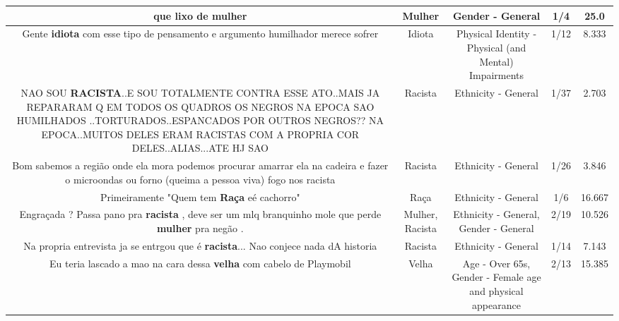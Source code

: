 \documentclass[11pt]{article}
\newlength\mylength
\begin{document}
\begin{center}
\begin{longtable}{|C{.65\mylength}|C{.30\mylength}|C{.12\mylength}|C{.12\mylength}|C{.12\mylength}|}
  \small que lixo de mulher\normalsize   & Mulher & Gender - General & 1/4 & 25.0 \\  \hline
  \small Gente \textbf{idiota} com esse tipo de pensamento e argumento humilhador merece sofrer\normalsize   & Idiota & Physical Identity - Physical (and Mental) Impairments & 1/12 & 8.333 \\  \hline
  \small NAO SOU \textbf{RACISTA}..E SOU TOTALMENTE CONTRA ESSE ATO..MAIS JA REPARARAM Q EM TODOS OS QUADROS OS NEGROS NA EPOCA SAO HUMILHADOS ..TORTURADOS..ESPANCADOS POR OUTROS NEGROS?? NA EPOCA..MUITOS DELES ERAM RACISTAS COM A PROPRIA COR DELES..ALIAS...ATE HJ SAO\normalsize   & Racista & Ethnicity - General & 1/37 & 2.703 \\  \hline
  \small Bom sabemos a região onde ela mora podemos procurar amarrar ela na cadeira e fazer o microondas ou forno (queima a pessoa viva) fogo nos racista\normalsize   & Racista & Ethnicity - General & 1/26 & 3.846 \\  \hline
  \small Primeiramente "Quem tem \textbf{Raça} eé cachorro"\normalsize   & Raça & Ethnicity - General & 1/6 & 16.667 \\  \hline
  \small Engraçada ? Passa pano pra \textbf{racista} , deve ser um mlq branquinho mole que perde \textbf{mulher} pra negão .\normalsize   & Mulher, Racista & Ethnicity - General, Gender - General & 2/19 & 10.526 \\  \hline
  \small Na propria entrevista ja se entrgou que é \textbf{racista}... Nao conjece nada dA historia\normalsize   & Racista & Ethnicity - General & 1/14 & 7.143 \\  \hline
  \small Eu teria lascado a mao na cara dessa \textbf{v\textbf{elha}} com cabelo de Playmobil\normalsize   & Velha & Age - Over 65s, Gender - Female age and physical appearance & 2/13 & 15.385 \\  \hline

\end{longtable}
\end{center}
\end{document}
